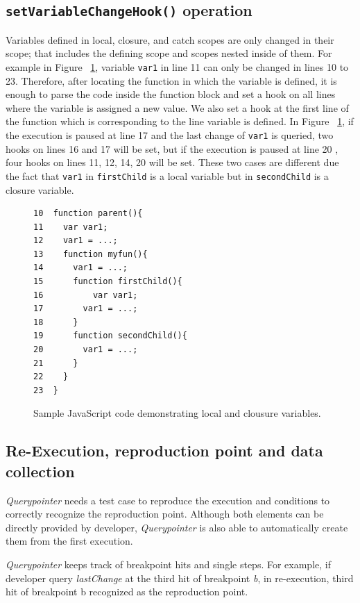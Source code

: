 \documentclass[preprint]{sigplanconf}
\begin{document}
\subsection{\texttt{setVariableChangeHook()} operation}
Variables defined in local, closure, and catch scopes are only changed in
their scope; that includes the defining scope and scopes nested inside of them.
For example in Figure ~\ref{fig:js-closure}, variable \texttt{var1} in line 11 can only be
changed in lines 10 to 23. Therefore, after locating the function in
which the variable is defined, it is enough to parse the code inside
the function block and set a hook on all lines where the variable is
assigned a new value. 
We also set a hook at the first line of the function which is
corresponding to the line variable is defined. In Figure
~\ref{fig:js-closure}, if the execution is paused at line 17 and the
last change of \texttt{var1} is queried, two hooks on lines 16 and 17
will be set, but if the execution is paused at line 20 , four hooks on
lines 11, 12, 14, 20 will be set. These two cases are different due
the fact that \texttt{var1} in \texttt{firstChild} is a local variable
but in \texttt{secondChild} is a closure variable.

\begin{figure}[htp]
\begin{verbatim}
10  function parent(){
11    var var1;
12    var1 = ...;
13    function myfun(){
14      var1 = ...;
15      function firstChild(){
16       	var var1;
17        var1 = ...;
18      }  
19      function secondChild(){
20        var1 = ...;			      
21      }
22    }  
23  }    
\end{verbatim}
\caption{Sample JavaScript code demonstrating local and clousure variables.}
\label{fig:js-closure}
\end{figure}

\subsection{Re-Execution, reproduction point and data collection}
\textit{Querypointer} needs a test case to reproduce the
execution and conditions to correctly recognize the reproduction point. 
Although both elements can be directly provided by developer, \textit{Querypointer}
is also able to automatically create them from the first execution. 

\textit{Querypointer} keeps track of breakpoint hits and single steps. For example, 
if developer query \textit{lastChange} at the third hit of breakpoint \textit{b}, in
re-execution, third hit of breakpoint b recognized as the reproduction point. 
\end{document}
